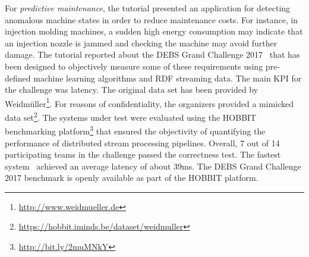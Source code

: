 For \emph{predictive maintenance}, the tutorial presented an application for detecting anomalous machine states in order to reduce maintenance costs. For instance, in injection molding machines, a sudden high energy consumption may indicate that an injection nozzle is jammed and checking the machine may avoid further damage. The tutorial reported about the DEBS Grand Challenge 2017~\cite{gulisano_et_al_2017} that has been designed to objectively measure some of these requirements using pre-defined machine learning algorithms and RDF streaming data. The main KPI for the challenge was latency. The original data set has been provided by \textsf{Weidmüller}\footnote{\url{http://www.weidmueller.de}}. For reasons of confidentiality, the organizers provided a mimicked data set\footnote{\url{https://hobbit.iminds.be/dataset/weidmuller}}. The systems under test were evaluated using the \textsf{H\small OBBIT} benchmarking platform\footnote{\url{http://bit.ly/2muMNkY}} that ensured the objectivity of quantifying the performance of distributed stream processing pipelines. Overall, 7 out of 14 participating teams in the challenge passed the correctness test. The fastest system~\cite{amariei_et_al_2017} achieved an average latency of about 39ms. The DEBS Grand Challenge 2017 benchmark is openly available as part of the \textsf{H\small OBBIT} platform.







